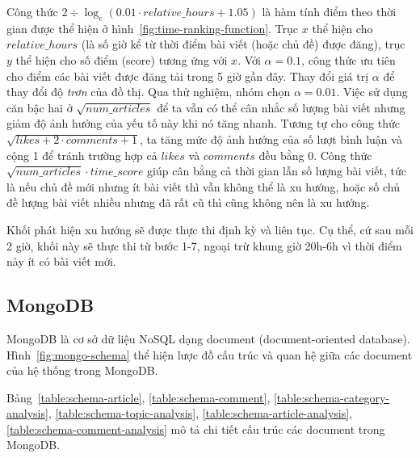 Công thức $2 \div \log_{e}(0.01 \cdot relative\_hours + 1.05)$ là hàm tính điểm theo thời gian được thể hiện ở hình~\ref{fig:time-ranking-function}. Trục $x$ thể hiện cho $relative\_hours$ (là số giờ kể từ thời điểm bài viết (hoặc chủ đề) được đăng), trục $y$ thể hiện cho số điểm (score) tương ứng với $x$. Với $\alpha=0.1$, công thức ưu tiên cho điểm các bài viết được đăng tải trong 5 giờ gần đây. Thay đổi giá trị $\alpha$ để thay đổi độ \textit{trơn} của đồ thị. Qua thử nghiệm, nhóm chọn $\alpha=0.01$. Việc sử dụng căn bậc hai ở $\sqrt{num\_articles}$ để ta vẫn có thể cân nhắc số lượng bài viết nhưng giảm độ ảnh hưởng của yếu tố này khi nó tăng nhanh. Tương tự cho công thức $\sqrt{likes + 2 \cdot comments + 1}$, ta tăng mức độ ảnh hưởng của số lượt bình luận và cộng 1 để tránh trường hợp cả $likes$ và $comments$ đều bằng $0$. Công thức $\sqrt{num\_articles} \cdot time\_score$ giúp cân bằng cả thời gian lẫn số lượng bài viết, tức là nếu chủ đề mới nhưng ít bài viết thì vẫn không thể là xu hướng, hoặc số chủ đề lượng bài viết nhiều nhưng đã rất cũ thì cũng không nên là xu hướng.


Khối phát hiện xu hướng sẽ được thực thi định kỳ và liên tục. Cụ thể, cứ sau mỗi 2 giờ, khối này sẽ thực thi từ bước 1-7, ngoại trừ khung giờ 20h-6h vì thời điểm này ít có bài viết mới.

\subsection{MongoDB}
MongoDB là cơ sở dữ liệu NoSQL dạng document (document-oriented database). Hình~\ref{fig:mongo-schema} thể hiện lược đồ cấu trúc và quan hệ giữa các document của hệ thống trong MongoDB.

Bảng~\ref{table:schema-article}, \ref{table:schema-comment}, \ref{table:schema-category-analysis}, \ref{table:schema-topic-analysis}, \ref{table:schema-article-analysis}, \ref{table:schema-comment-analysis} mô tả chi tiết cấu trúc các document trong MongoDB.


